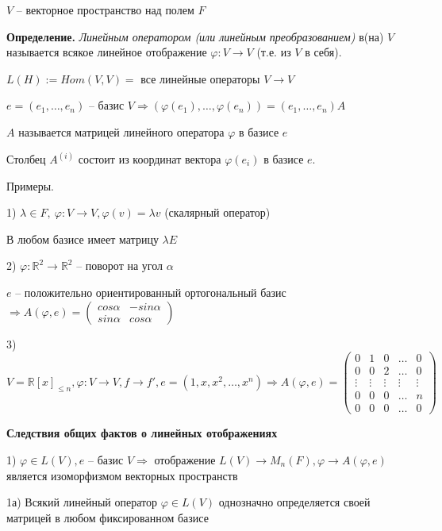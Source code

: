 $V$ -- векторное пространство над полем $F$

\textbf{Определение.} \textit{Линейным оператором (или линейным преобразованием)} в(на) $V$ называется всякое линейное отображение $\varphi: V \rightarrow V$ (т.е. из $V$ в себя).

\vspace{\baselineskip}
$L(H) := Hom(V, V) = $ {все линейные операторы $V \rightarrow V$}

$e = (e_1, \dots, e_n)$ -- базис $V \Rightarrow (\varphi(e_1), \dots, \varphi(e_n)) = (e_1, \dots, e_n) A$

$A$ называется матрицей линейного оператора $\varphi$ в базисе $e$

Столбец $A^{(i)}$ состоит из координат вектора $\varphi(e_i)$ в базисе $e$.

\vspace{\baselineskip}
Примеры.

1) $\lambda \in F, \ \varphi: V \rightarrow V, \varphi(v) = \lambda v$ (скалярный оператор)

В любом базисе имеет матрицу $\lambda E$

2) $\varphi: \mathbb{R}^2 \rightarrow \mathbb{R}^2$ -- поворот на угол $\alpha$

$e$ -- положительно ориентированный ортогональный базис $\Rightarrow A(\varphi, e) = \begin{pmatrix} cos \alpha & -sin \alpha \\ sin \alpha & cos \alpha \end{pmatrix}$

3) $V = \mathbb{R}[x]_{\leq n}, \varphi: V \rightarrow V, f \rightarrow f', e = (1, x, x^2, \dots, x^n) \Rightarrow A(\varphi, e) = \begin{pmatrix} 0 & 1 & 0 & \dots & 0 \\ 0 & 0 & 2 & \dots & 0 \\ \vdots & \vdots & \vdots & \vdots & \vdots \\ 0 & 0 & 0 & \dots & n \\ 0 & 0 & 0 & \dots & 0 \end{pmatrix}$

\vspace{\baselineskip}
\textbf{Следствия общих фактов о линейных отображениях}

1) $\varphi \in L(V), e$ -- базис $V \Rightarrow$ отображение $L(V) \rightarrow M_n(F), \varphi \rightarrow A(\varphi, e)$ является изоморфизмом векторных пространств

1а) Всякий линейный оператор $\varphi \in L(V)$ однозначно определяется своей матрицей в любом фиксированном базисе

